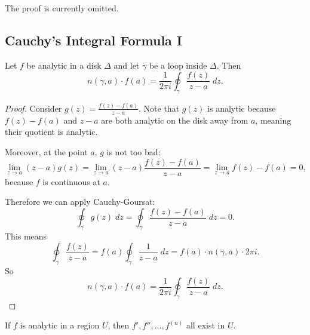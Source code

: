 The proof is currently omitted.

\subsection{Cauchy's Integral Formula I}
\begin{theorem}
    Let $f$ be analytic in a disk $\Delta$ and let $\gamma$ be a loop inside $\Delta$.
    Then
    \[ n(\gamma, a) \cdot f(a) = \frac{1}{2\pi i} \oint_{\gamma} 
    \frac{f(z)}{z-a} \; dz. \]
\end{theorem}

\begin{proof}
    Consider $g(z) = \frac{f(z) - f(a)}{z - a}$.
    Note that $g(z)$ is analytic because $f(z) - f(a)$ and $z-a$ are both analytic on the disk away from $a$, meaning their quotient is analytic.

    Moreover, at the point $a$, $g$ is not too bad:
    \[ \lim_{z \to a} (z-a) g(z) = \lim_{z \to a} (z-a) \frac{f(z) - f(a)}{z - a} = \lim_{z \to a} f(z) - f(a) = 0, \]
    because $f$ is continuous at $a$.

    Therefore we can apply Cauchy-Goursat:
    \[ \oint_{\gamma} g(z) \; dz = \oint_{\gamma} \frac{f(z) - f(a)}{z - a} \; dz = 0. \]
    This means
    \[ \oint_{\gamma} \frac{f(z)}{z - a} = f(a) \oint_{\gamma} \frac{1}{z-a} \; dz = f(a) \cdot n(\gamma, a) \cdot 2\pi i. \]
    So
    \[ n(\gamma, a) \cdot f(a) = \frac{1}{2\pi i} \oint_{\gamma} 
    \frac{f(z)}{z-a} \; dz. \]
\end{proof}

\begin{cor}
    If $f$ is analytic in a region $U$, then
    $f', f'', \ldots, f^{(n)}$ all exist in $U$.
\end{cor}

